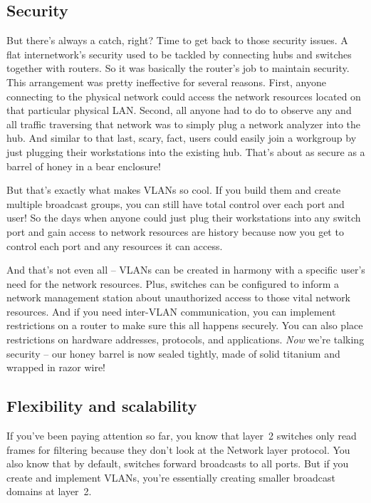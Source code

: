\documentclass[b5paper,11pt]{memoir}
\begin{document}
\subsection{Security}

But there's always a catch, right? Time to get back to those security
issues. A flat internetwork's security used to be tackled by connecting
hubs and switches together with routers. So it was basically the
router's job to maintain security. This arrangement was pretty
ineffective for several reasons. First, anyone connecting to the
physical network could access the network resources located on that
particular physical LAN. Second, all anyone had to do to observe any and
all traffic traversing that network was to simply plug a network
analyzer into the hub. And similar to that last, scary, fact, users
could easily join a workgroup by just plugging their workstations into
the existing hub. That's about as secure as a barrel of honey in a bear
enclosure!

But that's exactly what makes VLANs so cool. If you build them and
create multiple broadcast groups, you can still have total control over
each port and user! So the days when anyone could just plug their
workstations into any switch port and gain access to network resources
are history because now you get to control each port and any resources
it can access.

And that's not even all -- VLANs can be created in harmony with a
specific user's need for the network resources. Plus, switches can be
configured to inform a network management station about unauthorized
access to those vital network resources. And if you need inter-VLAN
communication, you can implement restrictions on a router to make sure
this all happens securely. You can also place restrictions on hardware
addresses, protocols, and applications. \emph{Now} we're talking
security -- our honey barrel is now sealed tightly, made of solid
titanium and wrapped in razor wire!

\subsection{Flexibility and scalability}

If you've been paying attention so far, you know that layer~2 switches only read frames for filtering because they don't look at the Network layer protocol.
You also know that by default, switches forward broadcasts to all ports. But if you create and implement VLANs, you're essentially creating smaller broadcast domains at layer~2.
\end{document}
